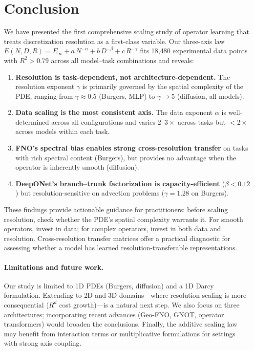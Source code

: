 \documentclass[11pt]{article}
\newcommand{\Einf}{E_\infty}
\begin{document}
\section{Conclusion}
\label{sec:conclusion}

We have presented the first comprehensive scaling study of operator
learning that treats discretization resolution as a first-class variable.
Our three-axis law
$E(N,D,R) = \Einf + a\,N^{-\alpha} + b\,D^{-\beta} + c\,R^{-\gamma}$
fits 18{,}480 experimental data points with $R^2 > 0.79$ across all
model--task combinations and reveals:

\begin{enumerate}
  \item \textbf{Resolution is task-dependent, not
    architecture-dependent.} The resolution exponent $\gamma$ is
    primarily governed by the spatial complexity of the PDE, ranging
    from $\gamma \approx 0.5$ (Burgers, MLP) to $\gamma \to 5$
    (diffusion, all models).
  \item \textbf{Data scaling is the most consistent axis.}
    The data exponent $\alpha$ is well-determined across all
    configurations and varies $2$--$3\times$ across tasks but
    $<2\times$ across models within each task.
  \item \textbf{FNO's spectral bias enables strong cross-resolution
    transfer} on tasks with rich spectral content (Burgers), but
    provides no advantage when the operator is inherently smooth
    (diffusion).
  \item \textbf{DeepONet's branch--trunk factorization is
    capacity-efficient} ($\beta < 0.12$) but resolution-sensitive on
    advection problems ($\gamma = 1.28$ on Burgers).
\end{enumerate}

These findings provide actionable guidance for practitioners: before
scaling resolution, check whether the PDE's spatial complexity warrants
it. For smooth operators, invest in data; for complex operators, invest
in both data and resolution. Cross-resolution transfer matrices offer
a practical diagnostic for assessing whether a model has learned
resolution-transferable representations.

\paragraph{Limitations and future work.}
Our study is limited to 1D PDEs (Burgers, diffusion) and a 1D Darcy
formulation. Extending to 2D and 3D domains---where resolution scaling
is more consequential ($R^d$ cost growth)---is a natural next step. We
also focus on three architectures; incorporating recent advances
(Geo-FNO, GNOT, operator transformers) would broaden the conclusions.
Finally, the additive scaling law may benefit from interaction terms or
multiplicative formulations for settings with strong axis coupling.
\end{document}
